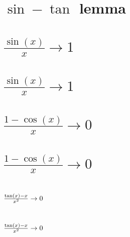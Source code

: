 \begin{spacing}{1.2}
\section*{${\sin} -{\tan}$ lemma} \label{DBsinSum}
\Desc{

}
\vspace{0.5cm}
\newpage
\section*{$\frac{\sin(x)}{x}\to 1$} \label{DBsin1}
\Fa{

}
\vspace{0.5cm}
\newpage
\section*{$\frac{\sin(x)}{x}\to 1$} \label{DBsin1Mo}
\Mo{

}
\vspace{0.5cm}
\newpage
\section*{$\frac{1-\cos(x)}{x}\to 0$} \label{DBsin2}
\Fa{

}
\vspace{0.5cm}
\newpage
\section*{$\frac{1-\cos(x)}{x}\to 0$} \label{DBsin2Mo}
\Mo{

}
\vspace{0.5cm}
\newpage
\section*{$\frac{\tan(x)-x}{x^2}\to 0$} \label{DBsin3}
\Fa{

}
\vspace{0.5cm}
\newpage
\section*{$\frac{\tan(x)-x}{x^2}\to 0$} \label{DBsin3Mo}
\Mo{

}
\vspace{0.5cm}
\newpage

\end{spacing}


